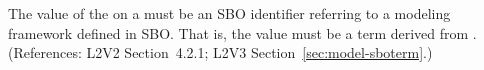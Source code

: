 The value of the   on a \Model must be an SBO
identifier referring to a modeling framework defined in SBO.  That is, the
value must be a term derived from \sboframework.  (References: L2V2
Section~4.2.1; L2V3 Section~\ref{sec:model-sboterm}.)
